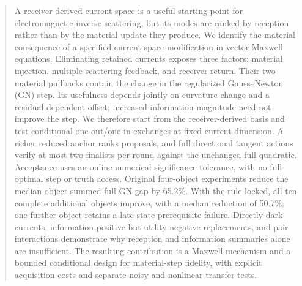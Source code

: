 \begin{abstract}
A receiver-derived current space is a useful starting point for electromagnetic inverse scattering, but its modes are ranked by reception rather than by the material update they produce. We identify the material consequence of a specified current-space modification in vector Maxwell equations. Eliminating retained currents exposes three factors: material injection, multiple-scattering feedback, and receiver return. Their two material pullbacks contain the change in the regularized Gauss--Newton (GN) step. Its usefulness depends jointly on curvature change and a residual-dependent offset; increased information magnitude need not improve the step. We therefore start from the receiver-derived basis and test conditional one-out/one-in exchanges at fixed current dimension. A richer reduced anchor ranks proposals, and full directional tangent actions verify at most two finalists per round against the unchanged full quadratic. Acceptance uses an online numerical significance tolerance, with no full optimal step or truth access. Original four-object experiments reduce the median object-summed full-GN gap by 65.2\%. With the rule locked, all ten complete additional objects improve, with a median reduction of 50.7\%; one further object retains a late-state prerequisite failure. Directly dark currents, information-positive but utility-negative replacements, and pair interactions demonstrate why reception and information summaries alone are insufficient. The resulting contribution is a Maxwell mechanism and a bounded conditional design for material-step fidelity, with explicit acquisition costs and separate noisy and nonlinear transfer tests.
\end{abstract}
